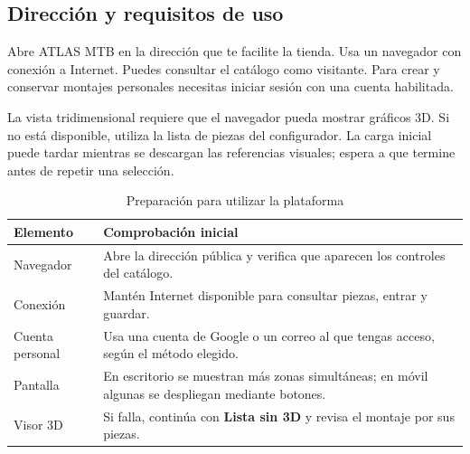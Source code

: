 \documentclass[12pt,letterpaper]{article}
\newenvironment{tabla}{\begingroup\singlespacing\small\setlength{\tabcolsep}{5pt}\renewcommand{\arraystretch}{1.25}}{\endgroup}
\newcommand{\control}[1]{\textbf{#1}}
\begin{document}
\subsection{Dirección y requisitos de uso}
Abre ATLAS MTB en la dirección que te facilite la tienda. Usa un navegador con conexión a Internet. Puedes consultar el catálogo como visitante. Para crear y conservar montajes personales necesitas iniciar sesión con una cuenta habilitada.

La vista tridimensional requiere que el navegador pueda mostrar gráficos 3D. Si no está disponible, utiliza la lista de piezas del configurador. La carga inicial puede tardar mientras se descargan las referencias visuales; espera a que termine antes de repetir una selección.

\begin{table}[H]\caption{Preparación para utilizar la plataforma}\label{tab:requisitos}\begin{tabla}\begin{tabularx}{\textwidth}{L{3.5cm}X}\toprule
Elemento & Comprobación inicial\\\midrule
Navegador & Abre la dirección pública y verifica que aparecen los controles del catálogo.\\
Conexión & Mantén Internet disponible para consultar piezas, entrar y guardar.\\
Cuenta personal & Usa una cuenta de Google o un correo al que tengas acceso, según el método elegido.\\
Pantalla & En escritorio se muestran más zonas simultáneas; en móvil algunas se despliegan mediante botones.\\
Visor 3D & Si falla, continúa con \control{Lista sin 3D} y revisa el montaje por sus piezas.\\\bottomrule
\end{tabularx}\end{tabla}\end{table}
\end{document}

